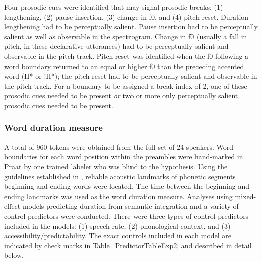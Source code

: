 \documentclass[12pt,titlepage]{article}
\newcommand{\IGNORE}[1]{} %
\begin{document}



Four prosodic cues were identified that may signal prosodic breaks: (1) lengthening, (2) pause insertion, (3) change in f0, and (4) pitch reset. Duration lengthening had to be perceptually salient. Pause insertion had to be perceptually salient as well as observable in the spectrogram. Change in f0 (usually a fall in pitch, in these declarative utterances) had to be perceptually salient and observable in the pitch track. Pitch reset was identified when the f0 following a word boundary returned to an equal or higher f0 than the preceding accented word (H* or !H*); the pitch reset had to be perceptually salient and observable in the pitch track. For a boundary to be assigned a break index of 2, one of these prosodic cues needed to be present \textit{or} two or more only perceptually salient prosodic cues needed to be present.

\subsubsection{Word duration measure} A total of 960 tokens were obtained from the full set of 24 speakers.\IGNORE{ in \cite{GillespiePearlmutter11}\footnote{These tokens include the 640 tokens used in the ToBI labeling plus an additional 320 tokens from eight additional participants.}.} Word boundaries for each word position within the preambles were hand-marked in Praat \cite{Praat} by one trained labeler who was blind to the hypothesis. Using the guidelines established in , reliable acoustic landmarks of phonetic segments beginning and ending words were located. The time between the beginning and ending landmarks was used as the word duration measure. \IGNORE{Durations by one trained coder, blind to the hypothesis, were used in} Analyses using mixed-effect models predicting duration from semantic integration and a variety of control predictors were conducted. There were three types of control predictors included in the models: (1) speech rate, (2) phonological context, and (3) accessibility/predictability.  The exact controls included in each model are indicated by check marks in Table~\ref{PredictorTableExp2} and described in detail below.
\end{document}
